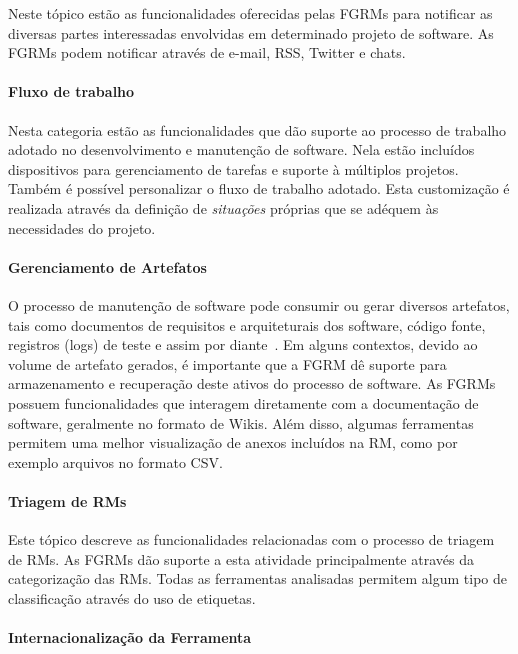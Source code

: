 Neste tópico estão as funcionalidades oferecidas pelas FGRMs para notificar as
diversas partes interessadas envolvidas em determinado projeto de software. As
FGRMs podem notificar através de e-mail, RSS, Twitter e chats.

\paragraph{Fluxo de trabalho}
\label{par:fluxo_de_trabalho}

Nesta categoria estão as funcionalidades que dão suporte ao processo de trabalho
adotado no desenvolvimento e manutenção de software. Nela estão incluídos
dispositivos para gerenciamento de tarefas e suporte à múltiplos projetos.
Também é possível personalizar o fluxo de trabalho adotado. Esta customização é
realizada através da definição de \textit{situações} próprias que se adéquem às
necessidades do projeto.

\paragraph{Gerenciamento de Artefatos}
\label{par:gerenciamento_de_artefatos}

O processo de manutenção de software pode consumir ou gerar diversos artefatos,
tais como documentos de requisitos e arquiteturais dos software, código fonte,
registros (logs) de teste e assim por diante~\cite{cavalcanti2013bug}. Em alguns
contextos, devido ao volume de artefato gerados, é importante que a FGRM dê
suporte para armazenamento e recuperação deste ativos do processo de software.
As FGRMs possuem funcionalidades que interagem diretamente com a documentação
de software, geralmente no formato de Wikis. Além disso, algumas ferramentas
permitem uma melhor visualização de anexos incluídos na RM, como por
exemplo arquivos no formato CSV\@.

\paragraph{Triagem de RMs}
\label{par:triagem_de_rm_s}

Este tópico descreve as funcionalidades relacionadas com o processo de triagem
de RMs. As FGRMs dão suporte a esta atividade principalmente através da
categorização das RMs. Todas as ferramentas analisadas permitem algum tipo de
classificação através do uso de etiquetas.

\paragraph{Internacionalização da Ferramenta}
\label{par:internacionalização_da_ferramenta}

